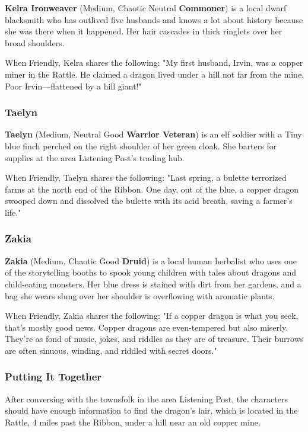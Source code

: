 \documentclass[letterpaper, 11pt, twocolumn]{dndbook}
\begin{document}
\textbf{Kelra Ironweaver} (Medium, Chaotic Neutral \textbf{Commoner}) is a local dwarf blacksmith who has outlived five husbands and knows a lot about history because she was there when it happened. Her hair cascades in thick ringlets over her broad shoulders.

When Friendly, Kelra shares the following: "My first husband, Irvin, was a copper miner in the Rattle. He claimed a dragon lived under a hill not far from the mine. Poor Irvin---flattened by a hill giant!"

\subsubsection{Taelyn}

\textbf{Taelyn} (Medium, Neutral Good \textbf{Warrior Veteran}) is an elf soldier with a Tiny blue finch perched on the right shoulder of her green cloak. She barters for supplies at the area Listening Post's trading hub.

When Friendly, Taelyn shares the following: "Last spring, a bulette terrorized farms at the north end of the Ribbon. One day, out of the blue, a copper dragon swooped down and dissolved the bulette with its acid breath, saving a farmer's life."

\subsubsection{Zakia}

\textbf{Zakia} (Medium, Chaotic Good \textbf{Druid}) is a local human herbalist who uses one of the storytelling booths to spook young children with tales about dragons and child-eating monsters. Her blue dress is stained with dirt from her gardens, and a bag she wears slung over her shoulder is overflowing with aromatic plants.

When Friendly, Zakia shares the following: "If a copper dragon is what you seek, that's mostly good news. Copper dragons are even-tempered but also miserly. They're as fond of music, jokes, and riddles as they are of treasure. Their burrows are often sinuous, winding, and riddled with secret doors."


\subsubsection{Putting It Together}

After conversing with the townsfolk in the area Listening Post, the characters should have enough information to find the dragon's lair, which is located in the Rattle, 4 miles past the Ribbon, under a hill near an old copper mine.
\end{document}
